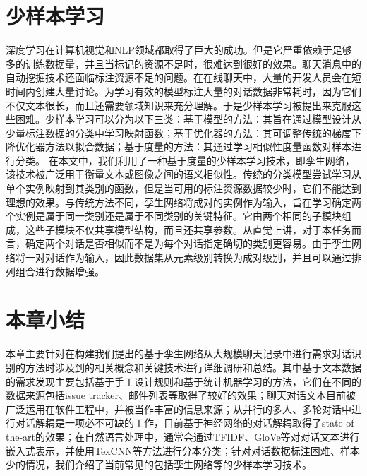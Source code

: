 \section{少样本学习}
深度学习在计算机视觉和NLP领域都取得了巨大的成功。但是它严重依赖于足够多的训练数据量，并且当标记的资源不足时，很难达到很好的效果。聊天消息中的自动挖掘技术还面临标注资源不足的问题。在在线聊天中，大量的开发人员会在短时间内创建大量讨论。为学习有效的模型标注大量的对话数据非常耗时，因为它们不仅文本很长，而且还需要领域知识来充分理解。于是少样本学习被提出来克服这些困难\cite{wang2019few}。少样本学习可以分为以下三类\cite{chen2019closer}：基于模型的方法：其旨在通过模型设计从少量标注数据的分类中学习映射函数；基于优化器的方法：其可调整传统的梯度下降优化器方法以拟合数据；基于度量的方法：其通过学习相似性度量函数对样本进行分类。
在本文中，我们利用了一种基于度量的少样本学习技术，即孪生网络\cite{bromley1994signature}，该技术被广泛用于衡量文本或图像之间的语义相似性\cite{mueller2016siamese}。传统的分类模型尝试学习从单个实例映射到其类别的函数，但是当可用的标注资源数据较少时，它们不能达到理想的效果。与传统方法不同，孪生网络将成对的实例作为输入，旨在学习确定两个实例是属于同一类别还是属于不同类别的关键特征。它由两个相同的子模块组成，这些子模块不仅共享模型结构，而且还共享参数。从直觉上讲，对于本任务而言，确定两个对话是否相似而不是为每个对话指定确切的类别更容易。由于孪生网络将一对对话作为输入，因此数据集从元素级别转换为成对级别，并且可以通过排列组合进行数据增强。

\section{本章小结}

本章主要针对在构建我们提出的基于孪生网络从大规模聊天记录中进行需求对话识别的方法时涉及到的相关概念和关键技术进行详细调研和总结。其中基于文本数据的需求发现主要包括基于手工设计规则和基于统计机器学习的方法，它们在不同的数据来源包括issue tracker、邮件列表等取得了较好的效果；聊天对话文本目前被广泛运用在软件工程中，并被当作丰富的信息来源；从并行的多人、多轮对话中进行对话解耦是一项必不可缺的工作，目前基于神经网络的对话解耦取得了state-of-the-art的效果；在自然语言处理中，通常会通过TFIDF、GloVe等对对话文本进行嵌入式表示，并使用TexCNN等方法进行分本分类；针对对话数据标注困难、样本少的情况，我们介绍了当前常见的包括孪生网络等的少样本学习技术。

